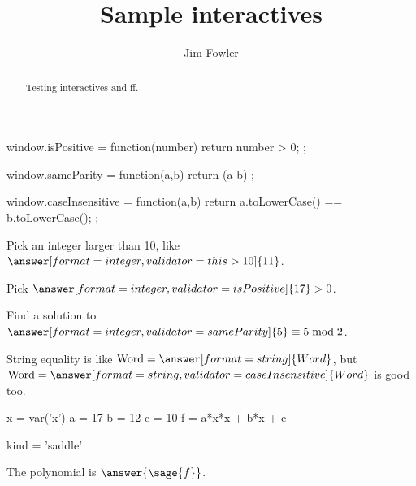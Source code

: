 \documentclass{ximera}
\title{Sample interactives}
\author{Jim Fowler}
\begin{document}
\begin{abstract}
Testing interactives and ff.
\end{abstract}
\maketitle

\begin{javascript}
  window.isPositive = function(number) {
    return number > 0;
  };

  window.sameParity = function(a,b) {
    return (a-b)%
  };

  window.caseInsensitive = function(a,b) {
    return a.toLowerCase() == b.toLowerCase();
  };
\end{javascript}

\begin{problem}
  Pick an integer larger than 10, like $\answer[format=integer,validator=this>10]{11}$.

  Pick $\answer[format=integer,validator=isPositive]{17} > 0$.

  Find a solution to $\answer[format=integer,validator=sameParity]{5} \equiv 5 \bmod 2$.

  String equality is like $\mbox{Word} = \answer[format=string]{Word}$, but $\mbox{Word} = \answer[format=string,validator=caseInsensitive]{Word}$ is good too.
\end{problem}


\begin{sagesilent}
  x = var('x')
  a = 17
  b = 12
  c = 10
  f = a*x*x + b*x + c

  kind = 'saddle'
\end{sagesilent}

The polynomial is $\answer{\sage{f}}$.


\end{document}
